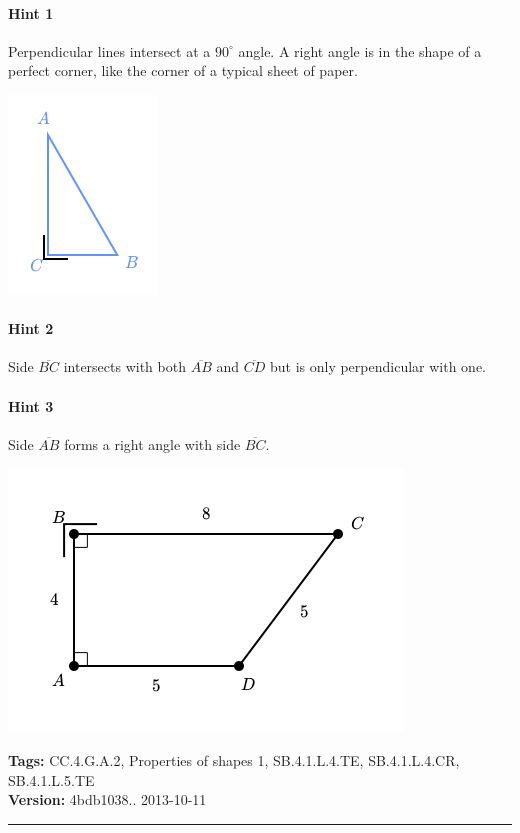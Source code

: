 \documentclass[twocolumn,10pt]{article}
\def\shrinkfactor{0.55}
\begin{document}
\paragraph{Hint 1}Perpendicular lines intersect at a $90 ^\circ$ angle.  
A right angle is in the shape of a perfect corner, like the corner of a typical sheet of paper.


\includegraphics[scale=\shrinkfactor]{figures/497661f48f441186b5e021d8ca8c4f0c7449214f.png}

\paragraph{Hint 2}Side $\overline{BC}$ intersects with both $\overline{AB}$ and $\overline{CD}$ but is only perpendicular with one.

\paragraph{Hint 3}Side $\overline{AB}$ forms a right angle with side $\overline{BC}$.

\includegraphics[scale=\shrinkfactor]{figures/88ceec57d0f6a64b4e8579ee9877e14f3e9b6889.png}



\medskip
\noindent
\textbf{Tags:} {\footnotesize CC.4.G.A.2, Properties of shapes 1, SB.4.1.L.4.TE, SB.4.1.L.4.CR, SB.4.1.L.5.TE}\\
\textbf{Version:} 4bdb1038.. 2013-10-11
\smallskip\hrule
\end{document}
